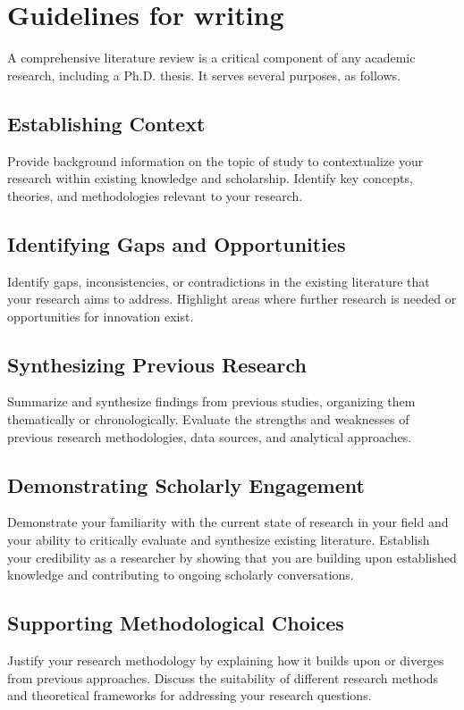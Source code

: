 \section{Guidelines for writing}
A comprehensive literature review is a critical component of any academic research, including a Ph.D. thesis.
It serves several purposes, as follows.

\subsection{Establishing Context}
Provide background information on the topic of study to contextualize your research within existing knowledge and scholarship.
Identify key concepts, theories, and methodologies relevant to your research.

\subsection{Identifying Gaps and Opportunities}
Identify gaps, inconsistencies, or contradictions in the existing literature that your research aims to address.
Highlight areas where further research is needed or opportunities for innovation exist.

\subsection{Synthesizing Previous Research}
Summarize and synthesize findings from previous studies, organizing them thematically or chronologically.
Evaluate the strengths and weaknesses of previous research methodologies, data sources, and analytical approaches.
    
\subsection{Demonstrating Scholarly Engagement}
Demonstrate your familiarity with the current state of research in your field and your ability to critically evaluate and synthesize existing literature.
Establish your credibility as a researcher by showing that you are building upon established knowledge and contributing to ongoing scholarly conversations.
    
\subsection{Supporting Methodological Choices}
Justify your research methodology by explaining how it builds upon or diverges from previous approaches.
Discuss the suitability of different research methods and theoretical frameworks for addressing your research questions.
    
